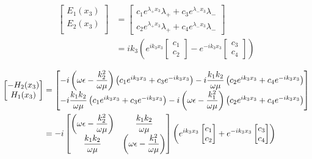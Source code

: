 \begin{align}
    \begin{bmatrix}
        E_1(x_3)\\
        E_2(x_3)\\
    \end{bmatrix}
    &=
    \begin{bmatrix}
        c_1 e^{\lambda_+ x_3} \lambda_{+} + c_3 e^{\lambda_- x_3} \lambda_{-} \\
        c_2 e^{\lambda_+ x_3} \lambda_{+} + c_4 e^{\lambda_- x_3} \lambda_{-}
    \end{bmatrix}\\
    &=ik_3\left( e^{ik_3 x_3}
    \begin{bmatrix}
        c_1 \\
        c_2
    \end{bmatrix}
    -e^{-ik_3 x_3}
    \begin{bmatrix}
        c_3 \\
        c_4
    \end{bmatrix}
    \right)
    \label{eq:imp_fourier:plan:generale_E}
\end{align}

\begin{align}
    \begin{bmatrix}
        -H_2(x_3)\\
        H_1(x_3)\\
    \end{bmatrix}
    &=
    \begin{bmatrix}
        -i\left(\omega\epsilon - \dfrac{k_2^2}{\omega\mu}\right) \left( c_1 e^{ik_3 x_3} + c_3 e^{-ik_3 x_3} \right) - i\dfrac{k_1k_2}{\omega\mu} \left( c_2 e^{ik_3 x_3} + c_4 e^{-ik_3 x_3} \right)
        \\
        -i\dfrac{k_1k_2}{\omega\mu} \left( c_1 e^{ik_3 x_3} + c_3 e^{-ik_3 x_3} \right) - i\left(\omega\epsilon - \dfrac{k_1^2}{\omega\mu}\right)\left( c_2 e^{ik_3 x_3} + c_4 e^{-ik_3 x_3} \right)
    \end{bmatrix} \\
    &=-i
    \begin{bmatrix}
    \left(\omega\epsilon - \dfrac{k_2^2}{\omega\mu}\right) & \dfrac{k_1k_2}{\omega\mu}
    \\
    \dfrac{k_1k_2}{\omega\mu} & \left(\omega\epsilon - \dfrac{k_1^2}{\omega\mu}\right) 
    \end{bmatrix}
    \left(
        e^{ik_3 x_3}
        \begin{bmatrix}
            c_1 \\
            c_2
        \end{bmatrix}
        +e^{-ik_3 x_3}
        \begin{bmatrix}
            c_3 \\
            c_4
        \end{bmatrix}
    \right)
    \label{eq:imp_fourier:plan:generale_H}
\end{align}


